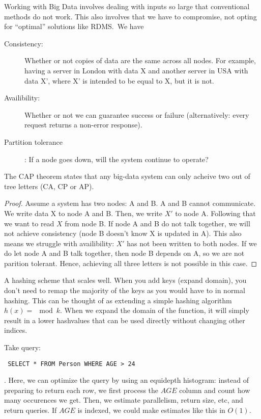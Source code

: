 \begin{definition}\label{def:captheorem}
    Working with Big Data involves dealing with inputs so large that conventional methods do not work.
    This also involves that we have to compromise, not opting for ``optimal'' solutions like RDMS.\
    We have 
    \begin{description}
        \item[Consistency:] Whether or not copies of data are the same across all nodes.
        For example, having a server in London with data X and another server in USA with data X', where X' is intended to be equal to X, but it is not.
        \item[Availibility:] Whether or not we can guarantee success or failure (alternatively: every request returns a non-error response).
        \item[Partition tolerance]:  If a node goes down, will the system continue to operate?
    \end{description}

    The CAP theorem states that any big-data system can only acheive two out of tree letters (CA, CP or AP).
\end{definition}

\begin{proof}
Assume a system has two nodes: A and B. A and B cannot communicate.
We write data X to node A and B. Then, we write $X'$ to node A. Following that we want to read $X$ from node B.
If node A and B do not talk together, we will not achieve consistency (node B doesn't know X is updated in A).
This also means we struggle with availibility: $X'$ has not been written to both nodes.
If we do let node A and B talk together, then node B depends on A, so we are not parition tolerant.
Hence, achieving all three letters is not possible in this case.
\end{proof}

\begin{definition}\label{def:consistenthashing}
    A hashing scheme that scales well. When you add keys (expand domain), you don't need to
    remap the majority of the keys as you would have to in normal hashing.
    This can be thought of as extending a simple hashing algorithm $h(x) = \mod k$.
    When we expand the domain of the function, it will simply result in a lower hashvalues that can
    be used directly without changing other indices.
\end{definition}

\begin{definition}\label{def:equidepthhistogram}
Take query: 
\begin{verbatim} SELECT * FROM Person WHERE AGE > 24 \end{verbatim}.
Here, we can optimize the query by using an equidepth histogram:
instead of preparing to return each row, we first process the $AGE$ column and count 
how many occurences we get. Then, we estimate parallelism, return size, etc, and return queries.
If $AGE$ is indexed, we could make estimates like  this in $O(1)$.
\end{definition}

